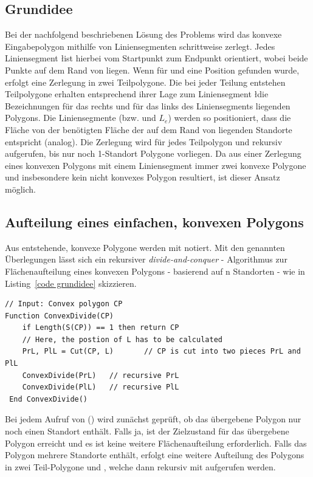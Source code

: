 \documentclass[ngerman]{seminarbeitrag}
\begin{document}
\subsection{Grundidee}\label{grundidee konvex}
Bei der nachfolgend beschriebenen Lösung des Problems wird das konvexe Eingabepolygon \cp mithilfe von Liniensegmenten schrittweise zerlegt. Jedes Liniensegment
\l ist hierbei vom Startpunkt \ls zum Endpunkt \Le orientiert, wobei beide Punkte auf dem Rand von \cp liegen. Wenn für \ls und \Le eine Position gefunden wurde, erfolgt eine
Zerlegung in zwei Teilpolygone.
Die bei jeder Teilung entstehen Teilpolygone erhalten entsprechend ihrer Lage zum Liniensegment \l die Bezeichnungen \prl für das rechts und \pll für das links
des Liniensegments liegenden Polygons. Die Liniensegmente (bzw. \ls und $L_{e}$) werden so positioniert, dass die Fläche von \prl der benötigten Fläche der auf dem Rand von \prl
liegenden Standorte entspricht (\pll analog). Die Zerlegung wird für jedes Teilpolygon \prl und \pll rekursiv aufgerufen, bis nur noch 1-Standort Polygone vorliegen. Da aus einer
Zerlegung eines konvexen Polygons mit einem Liniensegment immer zwei konvexe Polygone und insbesondere kein nicht konvexes Polygon resultiert, ist dieser Ansatz möglich.

\subsection{Aufteilung eines einfachen, konvexen Polygons}\label{aufteilung konvex}
Aus \cp entstehende, konvexe Polygone werden mit \cpi notiert. Mit den genannten Überlegungen lässt sich ein rekursiver \emph{divide-and-conquer} - Algorithmus
zur Flächenaufteilung eines konvexen Polygons - basierend auf n Standorten - wie in Listing~\ref{code grundidee} skizzieren.\\

\begin{lstlisting}[float,caption={Die Grundidee hinter dem Algorithmus \con}, frame=single, label=code grundidee]
// Input: Convex polygon CP
Function ConvexDivide(CP)
    if Length(S(CP)) == 1 then return CP
    // Here, the postion of L has to be calculated
    PrL, PlL = Cut(CP, L)       // CP is cut into two pieces PrL and PlL
    ConvexDivide(PrL)   // recursive PrL
    ConvexDivide(PlL)   // recursive PlL
 End ConvexDivide() 
\end{lstlisting}

Bei jedem Aufruf von \con(\cp) wird zunächst geprüft, ob das übergebene Polygon nur noch einen Standort enthält. Falls ja, ist der Zielzustand für das
übergebene Polygon erreicht und es ist keine weitere Flächenaufteilung erforderlich. Falls das Polygon mehrere Standorte enthält, erfolgt eine weitere Aufteilung
des Polygons in zwei Teil-Polygone \prl und \pll, welche dann rekursiv mit \con aufgerufen werden.
\end{document}
